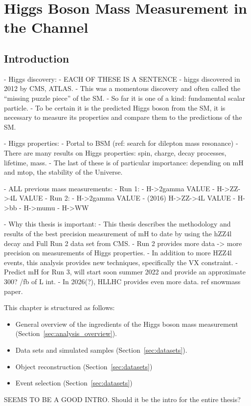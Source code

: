 \chapter{Higgs Boson Mass Measurement in the \texorpdfstring{\hzzfourl}{H to ZZ to 4l} Channel}
\section{Introduction}
- Higgs discovery:
    - EACH OF THESE IS A SENTENCE
    - higgs discovered in 2012 by CMS, ATLAS.
    - This was a momentous discovery and often called the ``missing puzzle piece'' of the SM.
    - So far it is one of a kind: fundamental scalar particle.
    - To be certain it is the predicted Higgs boson from the SM, it is necessary to measure its properties and compare them to the predictions of the SM.

- Higgs properties:
    - Portal to BSM (ref: search for dilepton mass resonance)
    - There are many results on Higgs properties: spin, charge, decay processes, lifetime, mass.
    - The last of these is of particular importance: depending on mH and mtop, the stability of the Universe.

- ALL previous mass measurements:
    - Run 1:
        - H->2gamma VALUE
        - H->ZZ->4L VALUE
    - Run 2:
        - H->2gamma VALUE
        - (2016) H->ZZ->4L VALUE
        - H->bb
        - H->mumu
        - H->WW 

- Why this thesis is important:
    - This thesis describes the methodology and results of the best precision measurement of mH to date by using the hZZ4l decay and Full Run 2 data set from CMS.
    - Run 2 provides more data -> more precision on measurements of Higgs properties.
    - In addition to more HZZ4l events, this analysis provides new techniques, specifically the VX constraint.
    - Predict mH for Run 3, will start soon summer 2022 and provide an approximate 300? /fb of L int.
    - In 2026(?), HLLHC provides even more data. ref snowmass paper.

This chapter is structured as follows:
\begin{itemize}
    \item General overview of the ingredients of the Higgs boson mass measurement (Section~\ref{sec:analysis_overview}).
    \item Data sets and simulated samples (Section~\ref{sec:datasets}).
    \item Object reconstruction (Section~\ref{sec:datasets})
    \item Event selection (Section~\ref{sec:datasets})
\end{itemize}

SEEMS TO BE A GOOD INTRO. Should it be the intro for the entire thesis?
